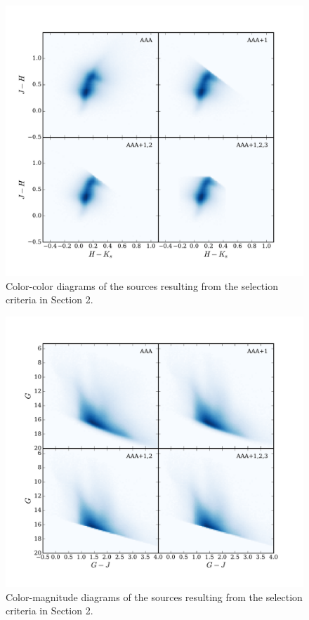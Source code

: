 \documentclass[onecolumn]{aa} %
\begin{document}
\begin{appendix}
\begin{figure}
\includegraphics[width = \hsize]{fig15.pdf}
\caption{Color-color diagrams of the sources resulting from the selection criteria in Section 2.}
\label{fig:app1}
\end{figure}
\begin{figure}
\includegraphics[width = \hsize]{fig16.pdf}
\caption{Color-magnitude diagrams of the sources resulting from the selection criteria in Section 2.}
\label{fig:app2}
\end{figure}


\end{appendix}
\end{document}

